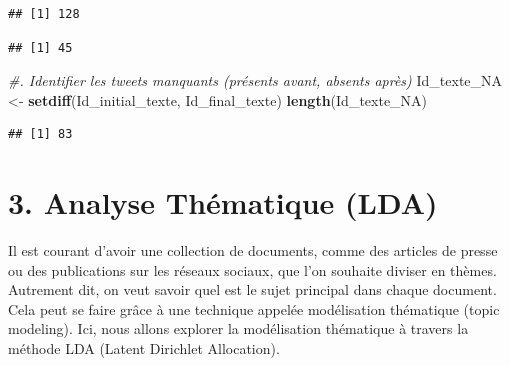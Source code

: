 \documentclass[
]{article}
\newenvironment{Shaded}{\begin{snugshade}}{\end{snugshade}}
\newcommand{\CommentTok}[1]{\textcolor[rgb]{0.56,0.35,0.01}{\textit{#1}}}
\newcommand{\FunctionTok}[1]{\textcolor[rgb]{0.13,0.29,0.53}{\textbf{#1}}}
\newcommand{\NormalTok}[1]{#1}
\newcommand{\OtherTok}[1]{\textcolor[rgb]{0.56,0.35,0.01}{#1}}
\newcommand{\SpecialCharTok}[1]{\textcolor[rgb]{0.81,0.36,0.00}{\textbf{#1}}}
\begin{document}
\begin{Shaded}
\end{Shaded}

\begin{verbatim}
## [1] 128
\end{verbatim}

\begin{Shaded}
\end{Shaded}

\begin{verbatim}
## [1] 45
\end{verbatim}

\begin{Shaded}
\begin{Highlighting}[]
\CommentTok{\#. Identifier les tweets manquants (présents avant, absents après)}
\NormalTok{Id\_texte\_NA }\OtherTok{\textless{}{-}} \FunctionTok{setdiff}\NormalTok{(Id\_initial\_texte, Id\_final\_texte)}
\FunctionTok{length}\NormalTok{(Id\_texte\_NA)}
\end{Highlighting}
\end{Shaded}

\begin{verbatim}
## [1] 83
\end{verbatim}

\section{3. Analyse Thématique (LDA)}\label{analyse-thuxe9matique-lda}

Il est courant d'avoir une collection de documents, comme des articles
de presse ou des publications sur les réseaux sociaux, que l'on souhaite
diviser en thèmes. Autrement dit, on veut savoir quel est le sujet
principal dans chaque document. Cela peut se faire grâce à une technique
appelée modélisation thématique (topic modeling). Ici, nous allons
explorer la modélisation thématique à travers la méthode LDA (Latent
Dirichlet Allocation).
\end{document}
